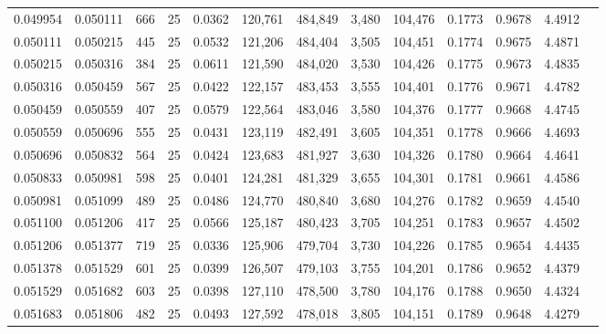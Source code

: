 \begin{tabular}{rrrrrrrrrrrrr}
0.049954 & 0.050111 &   666 &  25 &                                     0.0362 & 120,761 & 484,849 &   3,480 & 104,476 & 0.1773 & 0.9678 & 4.4912 \\
0.050111 & 0.050215 &   445 &  25 &                                     0.0532 & 121,206 & 484,404 &   3,505 & 104,451 & 0.1774 & 0.9675 & 4.4871 \\
0.050215 & 0.050316 &   384 &  25 &                                     0.0611 & 121,590 & 484,020 &   3,530 & 104,426 & 0.1775 & 0.9673 & 4.4835 \\
0.050316 & 0.050459 &   567 &  25 &                                     0.0422 & 122,157 & 483,453 &   3,555 & 104,401 & 0.1776 & 0.9671 & 4.4782 \\
0.050459 & 0.050559 &   407 &  25 &                                     0.0579 & 122,564 & 483,046 &   3,580 & 104,376 & 0.1777 & 0.9668 & 4.4745 \\
0.050559 & 0.050696 &   555 &  25 &                                     0.0431 & 123,119 & 482,491 &   3,605 & 104,351 & 0.1778 & 0.9666 & 4.4693 \\
0.050696 & 0.050832 &   564 &  25 &                                     0.0424 & 123,683 & 481,927 &   3,630 & 104,326 & 0.1780 & 0.9664 & 4.4641 \\
0.050833 & 0.050981 &   598 &  25 &                                     0.0401 & 124,281 & 481,329 &   3,655 & 104,301 & 0.1781 & 0.9661 & 4.4586 \\
0.050981 & 0.051099 &   489 &  25 &                                     0.0486 & 124,770 & 480,840 &   3,680 & 104,276 & 0.1782 & 0.9659 & 4.4540 \\
0.051100 & 0.051206 &   417 &  25 &                                     0.0566 & 125,187 & 480,423 &   3,705 & 104,251 & 0.1783 & 0.9657 & 4.4502 \\
0.051206 & 0.051377 &   719 &  25 &                                     0.0336 & 125,906 & 479,704 &   3,730 & 104,226 & 0.1785 & 0.9654 & 4.4435 \\
0.051378 & 0.051529 &   601 &  25 &                                     0.0399 & 126,507 & 479,103 &   3,755 & 104,201 & 0.1786 & 0.9652 & 4.4379 \\
0.051529 & 0.051682 &   603 &  25 &                                     0.0398 & 127,110 & 478,500 &   3,780 & 104,176 & 0.1788 & 0.9650 & 4.4324 \\
0.051683 & 0.051806 &   482 &  25 &                                     0.0493 & 127,592 & 478,018 &   3,805 & 104,151 & 0.1789 & 0.9648 & 4.4279 \\

\end{tabular}
